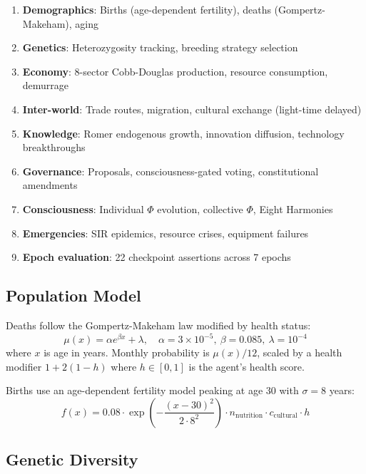 \documentclass[12pt,a4paper]{article}
\begin{document}
\begin{enumerate}
    \item \textbf{Demographics}: Births (age-dependent fertility), deaths (Gompertz-Makeham), aging
    \item \textbf{Genetics}: Heterozygosity tracking, breeding strategy selection
    \item \textbf{Economy}: 8-sector Cobb-Douglas production, resource consumption, demurrage
    \item \textbf{Inter-world}: Trade routes, migration, cultural exchange (light-time delayed)
    \item \textbf{Knowledge}: Romer endogenous growth, innovation diffusion, technology breakthroughs
    \item \textbf{Governance}: Proposals, consciousness-gated voting, constitutional amendments
    \item \textbf{Consciousness}: Individual $\Phi$ evolution, collective $\Phi$, Eight Harmonies
    \item \textbf{Emergencies}: SIR epidemics, resource crises, equipment failures
    \item \textbf{Epoch evaluation}: 22 checkpoint assertions across 7 epochs
\end{enumerate}

\subsection{Population Model}

Deaths follow the Gompertz-Makeham law modified by health status:
\begin{equation}
    \mu(x) = \alpha e^{\beta x} + \lambda, \quad \alpha = 3 \times 10^{-5},\ \beta = 0.085,\ \lambda = 10^{-4}
\end{equation}
where $x$ is age in years. Monthly probability is $\mu(x)/12$, scaled by a health modifier $1 + 2(1-h)$ where $h \in [0,1]$ is the agent's health score.

Births use an age-dependent fertility model peaking at age 30 with $\sigma = 8$ years:
\begin{equation}
    f(x) = 0.08 \cdot \exp\left(-\frac{(x-30)^2}{2 \cdot 8^2}\right) \cdot n_\text{nutrition} \cdot c_\text{cultural} \cdot h
\end{equation}

\subsection{Genetic Diversity}
\end{document}
